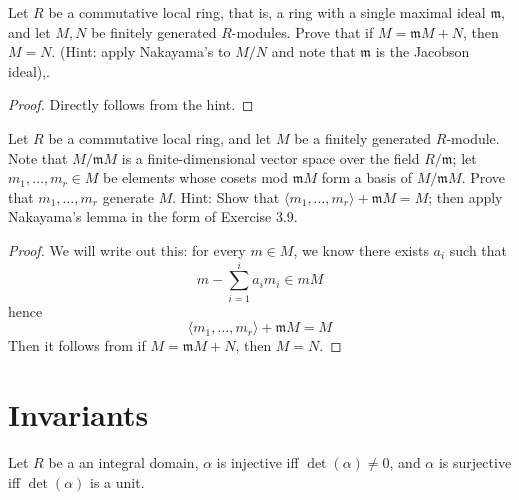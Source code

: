 \documentclass[openany]{book}
\newcommand{\la}{\langle}
\newcommand{\ra}{\rangle}
\begin{document}
\begin{prob}[3.9]
    Let \( R \) be a commutative local ring, that is, a ring with a single maximal ideal \( \mathfrak{m} \), and let \( M, N \) be finitely generated \( R \)-modules. Prove that if \( M = \mathfrak{m}M + N \), then \( M = N \). (Hint: apply Nakayama's to $M/N$ and note that $\mathfrak{m}$ is the Jacobson ideal),.
\end{prob}
\begin{proof}
    Directly follows from the hint.
\end{proof}

\begin{prob}[3.10]
    Let \( R \) be a commutative local ring, and let \( M \) be a finitely generated \( R \)-module. Note that \( M/\mathfrak{m}M \) is a finite-dimensional vector space over the field \( R/\mathfrak{m} \); let \( m_1, \ldots, m_r \in M \) be elements whose cosets mod \( \mathfrak{m}M \) form a basis of \( M/\mathfrak{m}M \). Prove that \( m_1, \ldots, m_r \) generate \( M \). Hint: Show that \(\langle m_1, \ldots, m_r \rangle + \mathfrak{m}M = M\); then apply Nakayama's lemma in the form of Exercise 3.9.
\end{prob}
\begin{proof}
    We will write out this: for every $m\in M$, we know there exists $a_i$ such that
    \begin{equation*}
        m-\sum_{i=1}^ia_{i}m_i\in mM
    \end{equation*}
    hence 
    \begin{equation*}
        \la m_1,\dots, m_r\ra+\mathfrak{m}M=M
    \end{equation*}
    Then it follows from if $M=\mathfrak{m}M+N$, then $M=N$.
\end{proof}







\section{Invariants}
\begin{prop}
    Let $R$ be a an integral domain, $\alpha$ is injective iff $\det(\alpha)\neq 0$, and $\alpha$ is surjective iff $\det(\alpha)$ is a unit.
\end{prop}
\end{document}
